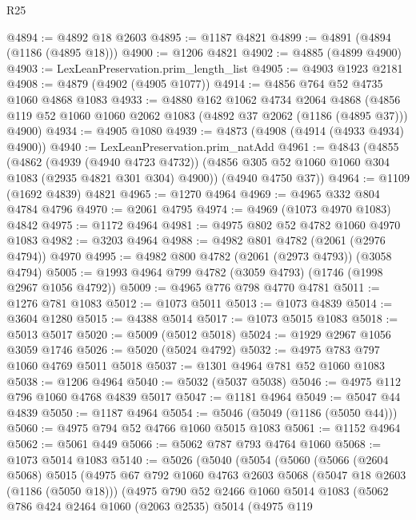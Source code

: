 \begin{lexlean}{R25}
\begin{coremodule}
@4894 := @4892 @18 @2603
@4895 := @1187 @4821
@4899 := @4891 (@4894 (@1186 (@4895 @18)))
@4900 := @1206 @4821
@4902 := @4885 (@4899 @4900)
@4903 := LexLeanPreservation.prim_length_list
@4905 := @4903 @1923 @2181
@4908 := @4879 (@4902 (@4905 @1077))
@4914 := @4856 @764 @52 @4735 @1060 @4868 @1083
@4933 := @4880
    @162
    @1062
    @4734
    @2064
    @4868
    (@4856 @119 @52 @1060 @1060 @2062 @1083 (@4892 @37 @2062 (@1186 (@4895 @37))) @4900)
@4934 := @4905 @1080
@4939 := @4873 (@4908 (@4914 (@4933 @4934) @4900))
@4940 := LexLeanPreservation.prim_natAdd
@4961 := @4843
    (@4855
      (@4862
        (@4939 (@4940 @4723 @4732))
        (@4856 @305 @52 @1060 @1060 @304 @1083 (@2935 @4821 @301 @304) @4900))
      (@4940 @4750 @37))
@4964 := @1109 (@1692 @4839) @4821
@4965 := @1270 @4964
@4969 := @4965 @332 @804 @4784 @4796
@4970 := @2061 @4795
@4974 := @4969 (@1073 @4970 @1083) @4842
@4975 := @1172 @4964
@4981 := @4975 @802 @52 @4782 @1060 @4970 @1083
@4982 := @3203 @4964
@4988 := @4982 @801 @4782 (@2061 (@2976 @4794)) @4970
@4995 := @4982 @800 @4782 (@2061 (@2973 @4793)) (@3058 @4794)
@5005 := @1993 @4964 @799 @4782 (@3059 @4793) (@1746 (@1998 @2967 @1056 @4792))
@5009 := @4965 @776 @798 @4770 @4781
@5011 := @1276 @781 @1083
@5012 := @1073 @5011
@5013 := @1073 @4839
@5014 := @3604 @1280
@5015 := @4388 @5014
@5017 := @1073 @5015 @1083
@5018 := @5013 @5017
@5020 := @5009 (@5012 @5018)
@5024 := @1929 @2967 @1056 @3059 @1746
@5026 := @5020 (@5024 @4792)
@5032 := @4975 @783 @797 @1060 @4769 @5011 @5018
@5037 := @1301 @4964 @781 @52 @1060 @1083
@5038 := @1206 @4964
@5040 := @5032 (@5037 @5038)
@5046 := @4975 @112 @796 @1060 @4768 @4839 @5017
@5047 := @1181 @4964
@5049 := @5047 @44 @4839
@5050 := @1187 @4964
@5054 := @5046 (@5049 (@1186 (@5050 @44)))
@5060 := @4975 @794 @52 @4766 @1060 @5015 @1083
@5061 := @1152 @4964
@5062 := @5061 @449
@5066 := @5062 @787 @793 @4764 @1060
@5068 := @1073 @5014 @1083
@5140 := @5026
    (@5040
      (@5054
        (@5060
          (@5066
            (@2604 @5068)
            @5015
            (@4975
              @67
              @792
              @1060
              @4763
              @2603
              @5068
              (@5047 @18 @2603 (@1186 (@5050 @18)))
              (@4975
                @790
                @52
                @2466
                @1060
                @5014
                @1083
                (@5062
                  @786
                  @424
                  @2464
                  @1060
                  (@2063 @2535)
                  @5014
                  (@4975
                    @119

\end{coremodule}
\end{lexlean}
